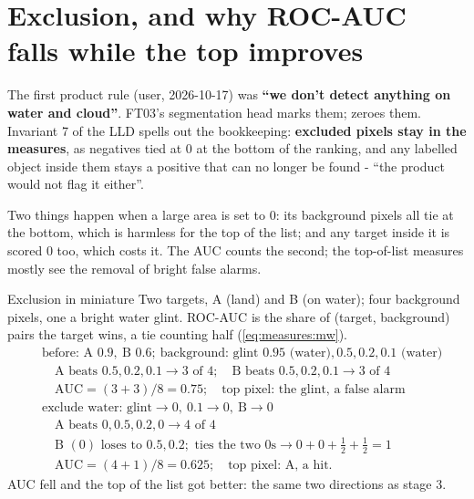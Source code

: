 \section{Exclusion, and why ROC-AUC falls while the top improves}\label{sec:runeval:exclude}

The first product rule (user, 2026-10-17) was \textbf{``we don't detect anything on water and cloud''}. FT03's
segmentation head marks them;  zeroes them. Invariant 7 of the LLD spells out the bookkeeping:
\textbf{excluded pixels stay in the measures}, as negatives tied at 0 at the bottom of the ranking, and any labelled
object inside them stays a positive that can no longer be found - ``the product would not flag it either''.

Two things happen when a large area is set to 0: its background pixels all tie at the bottom, which is harmless for the
top of the list; and any target inside it is scored 0 too, which costs it. The AUC counts the second; the top-of-list
measures mostly see the removal of bright false alarms.

\begin{worked}[label={we:runeval:mini}]{Exclusion in miniature}
Two targets, A (land) and B (on water); four background pixels, one a bright water glint. ROC-AUC is the share of
(target, background) pairs the target wins, a tie counting half (\cref{eq:measures:mw}).
\begin{align*}
&\text{before: A } 0.9,\ \text{B } 0.6;\ \text{background: glint } 0.95 \text{ (water)}, 0.5, 0.2, 0.1 \text{ (water)}\\
&\quad \text{A beats } 0.5, 0.2, 0.1 \to 3 \text{ of } 4; \quad \text{B beats } 0.5, 0.2, 0.1 \to 3 \text{ of } 4\\
&\quad \text{AUC} = (3 + 3)/8 = 0.75; \quad \text{top pixel: the glint, a false alarm}\\[4pt]
&\text{exclude water: glint} \to 0,\ 0.1 \to 0,\ \text{B} \to 0\\
&\quad \text{A beats } 0, 0.5, 0.2, 0 \to 4 \text{ of } 4\\
&\quad \text{B } (0) \text{ loses to } 0.5, 0.2; \text{ ties the two 0s} \to 0 + 0 + \tfrac12 + \tfrac12 = 1\\
&\quad \text{AUC} = (4 + 1)/8 = 0.625; \quad \text{top pixel: A, a hit.}
\end{align*}
AUC fell and the top of the list got better: the same two directions as stage 3.
\end{worked}

